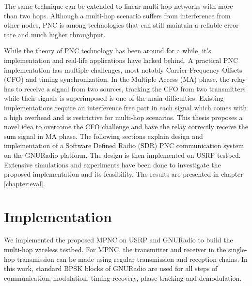 The same technique can be extended to linear multi-hop networks with more than two hops. Although a multi-hop scenario suffers from interference from other nodes, PNC is among technologies that can still maintain a reliable error rate and much higher throughput.

While the theory of PNC technology has been around for a while, it's implementation and real-life applications have lacked behind. A practical PNC implementation has multiple challenges, most notably Carrier-Frequency Offsets (CFO) and timing synchronization. In the Multiple Access (MA) phase, the relay has to receive a signal from two sources, tracking the CFO from two transmitters while their signals is superimposed is one of the main difficulties. Existing implementations require an interference free part in each signal which comes with a high overhead and is restrictive for multi-hop scenarios. This thesis proposes a novel idea to overcome the CFO challenge and have the relay correctly receive the sum signal in MA phase. The following sections explain design and implementation of a Software Defined Radio (SDR) PNC communication system on the GNURadio platform. The design is then implemented on USRP testbed. Extensive simulations and experiments have been done to investigate the proposed implementation and its feasibility. The results are presented in chapter \ref{chapter:eval}.

\section{Implementation}
We implemented the proposed MPNC on USRP and GNURadio to build the multi-hop wireless testbed.
For MPNC, the transmitter and receiver in the single-hop transmission can be made using regular transmission and reception chains. In this work, standard BPSK blocks of GNURadio are used for all steps of communication, modulation, timing recovery, phase tracking and demodulation.

